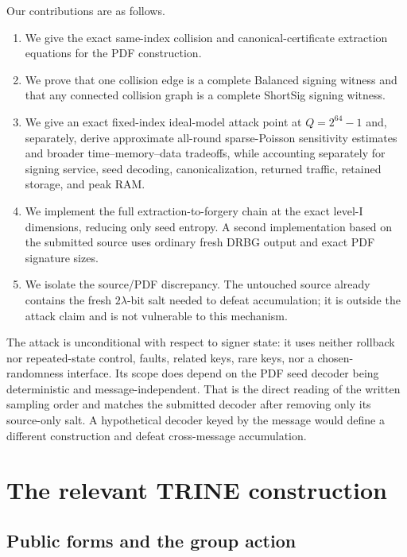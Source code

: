 \documentclass[11pt,a4paper]{article}
\begin{document}
Our contributions are as follows.
\begin{enumerate}[leftmargin=*,itemsep=2pt]
  \item We give the exact same-index collision and canonical-certificate
        extraction equations for the PDF construction.
  \item We prove that one collision edge is a complete Balanced signing
        witness and that any connected collision graph is a complete ShortSig
        signing witness.
  \item We give an exact fixed-index ideal-model attack point at
        $Q=2^{64}-1$ and, separately, derive approximate all-round
        sparse-Poisson sensitivity estimates and broader time--memory--data
        tradeoffs, while accounting separately for signing
        service, seed decoding, canonicalization, returned traffic, retained
        storage, and peak RAM.
  \item We implement the full extraction-to-forgery chain at the exact level-I
        dimensions, reducing only seed entropy.  A second implementation based
        on the submitted source uses ordinary fresh DRBG output and exact PDF
        signature sizes.
  \item We isolate the source/PDF discrepancy.  The untouched source already
        contains the fresh $2\lambda$-bit salt needed to defeat accumulation;
        it is outside the attack claim and is not vulnerable to this mechanism.
\end{enumerate}

The attack is unconditional with respect to signer state: it uses neither
rollback nor repeated-state control, faults, related keys, rare keys, nor a
chosen-randomness interface.  Its scope does depend on the PDF seed decoder
being deterministic and message-independent.  That is the direct reading of
the written sampling order and matches the submitted decoder after removing
only its source-only salt.  A hypothetical decoder keyed by the message would
define a different construction and defeat cross-message accumulation.

\section{The relevant TRINE construction}

\subsection{Public forms and the group action}
\end{document}
